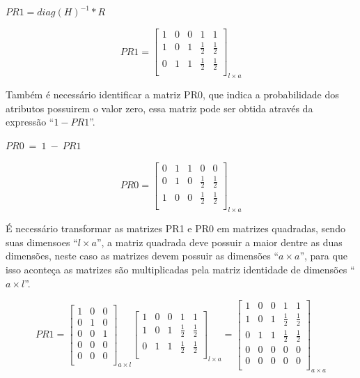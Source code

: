 \begin{center}
$PR1 = diag(H)^{-1} * R$
\end{center}

$$PR1=\left[
\begin{array}{ccccc}
1 & 0 & 0 & 1 & 1 \\
1 & 0 & 1 & \frac{1}{2} & \frac{1}{2} \\
0 & 1 & 1 & \frac{1}{2} & \frac{1}{2} \\
\end{array}
\right]_{l \times a}$$

Também é necessário identificar a matriz PR0, que indica a probabilidade dos
atributos possuirem o valor zero, essa matriz pode ser obtida através da
expressão ``$1 - PR1$''.

\begin{center}
$PR0 \ = \ 1 \ - \ PR1$
\end{center}

$$PR0=\left[
\begin{array}{ccccc}
0 & 1 & 1 & 0 & 0 \\
0 & 1 & 0 & \frac{1}{2} & \frac{1}{2} \\
1 & 0 & 0 & \frac{1}{2} & \frac{1}{2} \\
\end{array}
\right]_{l \times a}$$

É necessário transformar as matrizes PR1 e PR0 em matrizes quadradas,
sendo suas dimensoes ``${l \times a}$'', a matriz quadrada deve possuir
a maior dentre as duas dimensões, neste caso as matrizes devem possuir
as dimensões ``${a \times a}$'', para que isso aconteça as matrizes são
multiplicadas pela matriz identidade de dimensões ``${a \times l}$''.

$$PR1=\left[
\begin{array}{ccc}
1 & 0 & 0 \\
0 & 1 & 0 \\
0 & 0 & 1 \\
0 & 0 & 0 \\
0 & 0 & 0 \\
\end{array}
\right]_{a \times l}
\left[
\begin{array}{ccccc}
1 & 0 & 0 & 1 & 1 \\
1 & 0 & 1 & \frac{1}{2} & \frac{1}{2} \\
0 & 1 & 1 & \frac{1}{2} & \frac{1}{2} \\
\end{array}
\right]_{l \times a}
= \left[
\begin{array}{ccccc}
1 & 0 & 0 & 1 & 1 \\
1 & 0 & 1 & \frac{1}{2} & \frac{1}{2} \\
0 & 1 & 1 & \frac{1}{2} & \frac{1}{2} \\
0 & 0 & 0 & 0 & 0 \\
0 & 0 & 0 & 0 & 0 \\
\end{array}
\right]_{a \times a}$$

